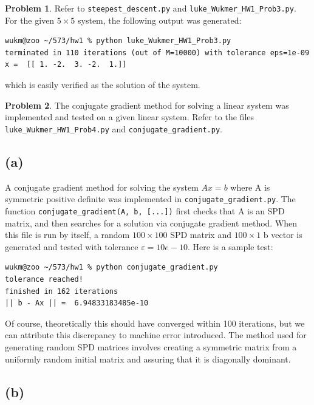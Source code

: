 \documentclass[10pt]{article}
\theoremstyle{plain}
\theoremstyle{definition}
\newtheorem{prob}{Problem}
\numberwithin{equation}{section}
\begin{document}
\hrulefill
\begin{prob}

    Refer to \texttt{steepest\_descent.py} and \texttt{luke\_Wukmer\_HW1\_Prob3.py}.
    For the given $5\times5$ system, the following output was generated:

\begin{verbatim}
wukm@zoo ~/573/hw1 % python luke_Wukmer_HW1_Prob3.py
terminated in 110 iterations (out of M=10000) with tolerance eps=1e-09
x =  [[ 1. -2.  3. -2.  1.]]
 \end{verbatim}

 which is easily verified as the solution of the system.
\end{prob}
\hrulefill

\begin{prob}
The conjugate gradient method for solving a linear system was implemented and tested on a given linear system.
Refer to the files \texttt{luke\_Wukmer\_HW1\_Prob4.py} and \texttt{conjugate\_gradient.py}.

\subsection*{(a)}

A conjugate gradient method for solving the system $Ax=b$ where A is symmetric
positive definite was implemented in \texttt{conjugate\_gradient.py}. The
function \texttt{conjugate\_gradient(A, b, [...])} first checks that A is an
SPD matrix, and then searches for a solution via conjugate gradient method.
When this file is run by itself, a random $100\times100$ SPD matrix
and $100\times1$ b vector is generated and tested with tolerance $ε=10e-10$.
Here is a sample test:

\begin{verbatim}
wukm@zoo ~/573/hw1 % python conjugate_gradient.py
tolerance reached!
finished in 162 iterations
|| b - Ax || =  6.94833183485e-10
\end{verbatim}

Of course, theoretically this should have converged within 100 iterations, but we can attribute this discrepancy to machine error introduced.
The method used for generating random SPD matrices involves creating a symmetric matrix from a uniformly random initial matrix and assuring that it is diagonally dominant.

\subsection*{(b)}


\end{prob}
\end{document}
